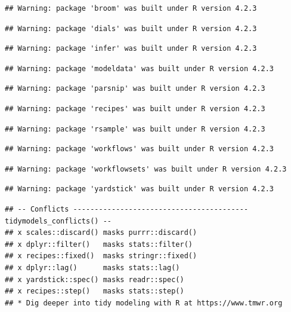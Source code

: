 \documentclass[
]{article}
\begin{document}
\begin{verbatim}
## Warning: package 'broom' was built under R version 4.2.3
\end{verbatim}

\begin{verbatim}
## Warning: package 'dials' was built under R version 4.2.3
\end{verbatim}

\begin{verbatim}
## Warning: package 'infer' was built under R version 4.2.3
\end{verbatim}

\begin{verbatim}
## Warning: package 'modeldata' was built under R version 4.2.3
\end{verbatim}

\begin{verbatim}
## Warning: package 'parsnip' was built under R version 4.2.3
\end{verbatim}

\begin{verbatim}
## Warning: package 'recipes' was built under R version 4.2.3
\end{verbatim}

\begin{verbatim}
## Warning: package 'rsample' was built under R version 4.2.3
\end{verbatim}

\begin{verbatim}
## Warning: package 'workflows' was built under R version 4.2.3
\end{verbatim}

\begin{verbatim}
## Warning: package 'workflowsets' was built under R version 4.2.3
\end{verbatim}

\begin{verbatim}
## Warning: package 'yardstick' was built under R version 4.2.3
\end{verbatim}

\begin{verbatim}
## -- Conflicts ----------------------------------------- tidymodels_conflicts() --
## x scales::discard() masks purrr::discard()
## x dplyr::filter()   masks stats::filter()
## x recipes::fixed()  masks stringr::fixed()
## x dplyr::lag()      masks stats::lag()
## x yardstick::spec() masks readr::spec()
## x recipes::step()   masks stats::step()
## * Dig deeper into tidy modeling with R at https://www.tmwr.org
\end{verbatim}
\end{document}
